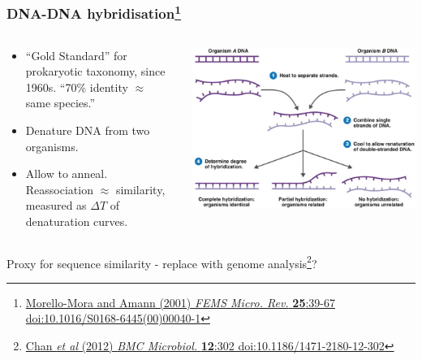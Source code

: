 \begin{frame}
  \frametitle{DNA-DNA hybridisation\footnote{\tiny{\href{http://dx.doi.org/10.1016/S0168-6445(00)00040-1}{Morello-Mora and Amann (2001) \textit{FEMS Micro. Rev.} \textbf{25}:39-67 doi:10.1016/S0168-6445(00)00040-1}}}}
  \begin{columns}[T]
    \begin{column}{5cm}
      \begin{itemize}
        \item ``Gold Standard'' for prokaryotic taxonomy, since 1960s. ``70\% identity $\approx$ same species.''
        \item Denature DNA from two organisms.
        \item Allow to anneal. Reassociation $\approx$ similarity, measured as $\Delta T$  of denaturation curves.
      \end{itemize}
    \end{column}
    \begin{column}{5cm}
      \includegraphics[width=1\textwidth]{images/ddh}
    \end{column}
  \end{columns}
Proxy for sequence similarity - replace with genome analysis\footnote{\tiny{\href{http://dx.doi.org/10.1186/1471-2180-12-302}{Chan \textit{et al} (2012) \textit{BMC Microbiol.} \textbf{12}:302 doi:10.1186/1471-2180-12-302}}}?
\end{frame}

